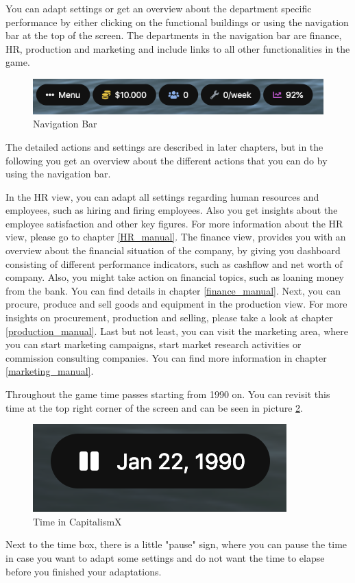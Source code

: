 \documentclass[11pt,titlepage,oneside,openany]{book}
\begin{document}
You can adapt settings or get an overview about the department specific performance by either clicking on the functional buildings or using the navigation bar at the top of the screen. The departments in the navigation bar are finance, HR, production and marketing and include links to all other functionalities in the game. 
\begin{figure}
    \centering
    \includegraphics [width=\textwidth]{images/navigationBar.png}
    \caption{Navigation Bar}
    \label{fig:navigationBar}
\end{figure} The detailed actions and settings are described in later chapters, but in the following you get an overview about the different actions that you can do by using the navigation bar.

In the HR view, you can adapt all settings regarding human resources and employees, such as hiring and firing employees. Also you get insights about the employee satisfaction and other key figures. For more information about the HR view, please go to chapter \ref{HR_manual}.
The finance view, provides you with an overview about the financial situation of the company, by giving you dashboard consisting of different performance indicators, such as cashflow and net worth of company. Also, you might take action on financial topics, such as loaning money from the bank. You can find details in chapter \ref{finance_manual}.
Next, you can procure, produce and sell goods and equipment in the production view. For more insights on procurement, production and selling, please take a look at chapter \ref{production_manual}. 
Last but not least, you can visit the marketing area, where you can start marketing campaigns, start market research activities or commission consulting companies. You can find more information in chapter \ref{marketing_manual}.

Throughout the game time passes starting from 1990 on. You can revisit this time at the top right corner of the screen and can be seen in picture \ref{fig:time}.
\begin{figure}
    \centering
    \includegraphics{images/time.png}
    \caption{Time in CapitalismX}
    \label{fig:time}
\end{figure}
Next to the time box, there is a little "pause" sign, where you can pause the time in case you want to adapt some settings and do not want the time to elapse before you finished your adaptations.
\end{document}
